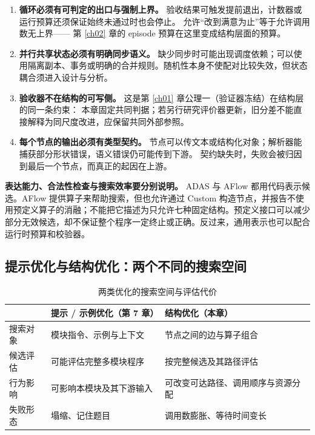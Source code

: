 \begin{enumerate}
  \item \textbf{循环必须有可判定的出口与强制上界。}
        验收结果可触发提前退出，计数器或运行预算还须保证始终未通过时也会停止。
        允许``改到满意为止''等于允许调用数无上界——
        第 \ref{ch02} 章的 episode 预算在这里变成结构层面的预算。
  \item \textbf{并行共享状态必须有明确同步语义。}
        缺少同步时可能出现调度依赖；可以使用隔离副本、事务或明确的合并规则。随机性本身不使配对比较失效，但状态耦合须进入设计与分析。
  \item \textbf{验收器不在结构的可写侧。}
        这是第 \ref{ch01} 章公理一（验证器冻结）在结构层的同一条约束：
        本章固定共同判据；若另行研究评价器更新，旧分差不能直接解释为同尺度改进，应保留共同外部参照。
  \item \textbf{每个节点的输出必须有类型契约。}
        节点可以传文本或结构化对象；解析器能捕获部分形状错误，语义错误仍可能传到下游。
        契约缺失时，失败会被归因到最后一个节点，而真正的起因在上游。
\end{enumerate}

\begin{principlebox}
\textbf{表达能力、合法性检查与搜索效率要分别说明。}
ADAS 与 AFlow 都用代码表示候选。AFlow 提供算子来帮助搜索，但也允许通过 Custom 构造节点，并报告不使用预定义算子的消融；不能把它描述为只允许七种固定结构。预定义接口可以减少部分无效候选，却不保证整个程序一定终止或正确。反过来，通用表示也可以配合运行时预算和校验器。
\end{principlebox}

\subsection{提示优化与结构优化：两个不同的搜索空间}
\label{sec:ch09-space}

\begin{table}[htbp]
\centering
\caption{两类优化的搜索空间与评估代价}
\label{tab:ch09-space}
\begin{tabular}{>{\raggedright\arraybackslash}p{2.8cm}>{\raggedright\arraybackslash}p{5.0cm}>{\raggedright\arraybackslash}p{5.1cm}}
\toprule
 & 提示 / 示例优化（第 7 章） & 结构优化（本章） \\
\midrule
搜索对象 & 模块指令、示例与上下文 & 节点之间的边与算子组合 \\
候选评估 & 可能评估完整多模块程序 & 按完整候选及其路径评估 \\
行为影响 & 可影响本模块及其下游输入 & 可改变可达路径、调用顺序与资源分配 \\
失败形态 & 塌缩、记住题目 & 调用数膨胀、等待时间变长 \\
\bottomrule
\end{tabular}
\end{table}

